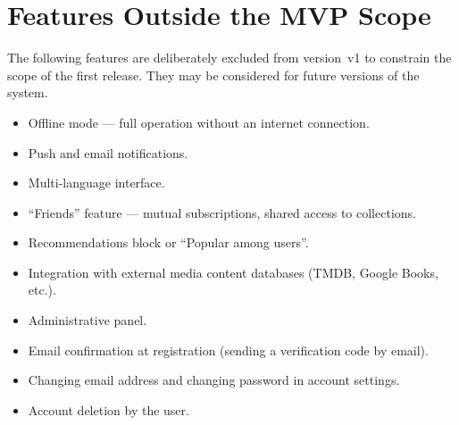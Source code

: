 \section{Features Outside the MVP Scope}
\label{sec:out-of-scope}

The following features are deliberately excluded from version~v1 to constrain the scope of the first release. They may be considered for future versions of the system. 

\begin{itemize}
  \item Offline mode --- full operation without an internet connection.
  \item Push and email notifications.
  \item Multi-language interface.
  \item ``Friends'' feature --- mutual subscriptions, shared access to collections.
  \item Recommendations block or ``Popular among users''.
  \item Integration with external media content databases (TMDB, Google Books, etc.).
  \item Administrative panel.
  \item Email confirmation at registration (sending a verification code by email).
  \item Changing email address and changing password in account settings.
  \item Account deletion by the user.
\end{itemize}
